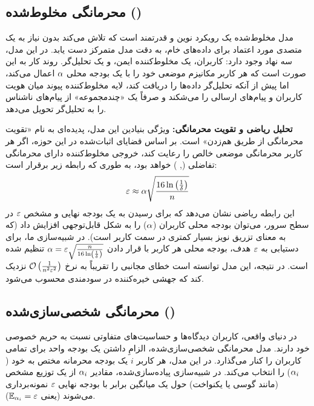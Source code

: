 \subsection{محرمانگی مخلوط‌شده ()}
مدل مخلوط‌شده یک رویکرد نوین و قدرتمند است که تلاش می‌کند بدون نیاز به یک متصدی مورد اعتماد برای داده‌های خام، به دقت مدل متمرکز دست یابد. در این مدل، سه نهاد وجود دارد: کاربران، یک مخلوط‌کننده ایمن، و یک تحلیل‌گر.
روند کار به این صورت است که هر کاربر مکانیزم موضعی خود را با یک بودجه محلی $\alpha$ اعمال می‌کند، اما پیش از آنکه تحلیل‌گر داده‌ها را دریافت کند، لایه مخلوط‌کننده پیوند میان هویت کاربران و پیام‌های ارسالی را می‌شکند و صرفاً یک «چندمجموعه» از پیام‌های ناشناس را به تحلیل‌گر تحویل می‌دهد.

\textbf{تحلیل ریاضی و تقویت محرمانگی:} ویژگی بنیادین این مدل، پدیده‌ای به نام «تقویت محرمانگی از طریق هم‌زدن» است. بر اساس قضایای اثبات‌شده در این حوزه، اگر هر کاربر محرمانگی موضعی خالص \LDP را رعایت کند، خروجی مخلوط‌کننده دارای محرمانگی تفاضلی (\eps, \del) خواهد بود، به طوری که رابطه زیر برقرار است:
\begin{equation}
    \varepsilon \approx \alpha \sqrt{\frac{16 \ln\left( \frac{1}{\delta} \right)}{n}}
\end{equation}
این رابطه ریاضی نشان می‌دهد که برای رسیدن به یک بودجه نهایی و مشخص $\varepsilon$ در سطح سرور، می‌توان بودجه محلی کاربران ($\alpha$) را به شکل قابل‌توجهی افزایش داد (که به معنای تزریق نویز بسیار کمتری در سمت کاربر است). در شبیه‌سازی ما، برای دستیابی به $\varepsilon$ هدف، بودجه محلی هر کاربر با قرار دادن $\alpha = \varepsilon \sqrt{\frac{n}{16 \ln\left( \frac{1}{\delta} \right)}}$ تنظیم شده است. در نتیجه، این مدل توانسته است خطای مجانبی را تقریباً به نرخ $\mathcal{O}\left( \frac{1}{n^2 \varepsilon^2} \right)$ نزدیک کند که جهشی خیره‌کننده در سودمندی محسوب می‌شود.

\subsection{محرمانگی شخصی‌سازی‌شده ()}
در دنیای واقعی، کاربران دیدگاه‌ها و حساسیت‌های متفاوتی نسبت به حریم خصوصی خود دارند. مدل محرمانگی شخصی‌سازی‌شده، الزامِ داشتن یک بودجه واحد برای تمامی کاربران را کنار می‌گذارد. در این مدل، هر کاربر $i$ یک بودجه محرمانه مختص به خود ($\alpha_i$) را انتخاب می‌کند. در شبیه‌سازی پیاده‌سازی‌شده، مقادیر $\alpha_i$ از یک توزیع مشخص (مانند گوسی یا یکنواخت) حول یک میانگین برابر با بودجه نهایی $\varepsilon$ نمونه‌برداری می‌شوند (یعنی $\Eset[\al_i] = \eps$).


